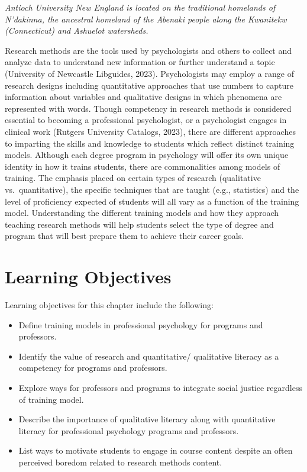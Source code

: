 \documentclass[
  11pt,
]{book}
\providecommand{\tightlist}{%
  \setlength{\itemsep}{0pt}\setlength{\parskip}{0pt}}
\begin{document}
\emph{Antioch University New England is located on the traditional homelands of N'dakinna, the ancestral homeland of the Abenaki people along the Kwanitekw (Connecticut) and Ashuelot watersheds.}~

Research methods are the tools used by psychologists and others to collect and analyze data to understand new information or further understand a topic (University of Newcastle Libguides, 2023). Psychologists may employ a range of research designs including quantitative approaches that use numbers to capture information about variables and qualitative designs in which phenomena are represented with words. Though competency in research methods is considered essential to becoming a professional psychologist, or a psychologist engages in clinical work (Rutgers University Catalogs, 2023), there are different approaches to imparting the skills and knowledge to students which reflect distinct training models. Although each degree program in psychology will offer its own unique identity in how it trains students, there are commonalities among models of training. The emphasis placed on certain types of research (qualitative vs.~quantitative), the specific techniques that are taught (e.g., statistics) and the level of proficiency expected of students will all vary as a function of the training model. Understanding the different training models and how they approach teaching research methods will help students select the type of degree and program that will best prepare them to achieve their career goals.

\section{Learning Objectives}\label{learning-objectives-2}

Learning objectives for this chapter include the following:

\begin{itemize}
\tightlist
\item
  Define training models in professional psychology for programs and professors.
\item
  Identify the value of research and quantitative/ qualitative literacy as a competency for programs and professors.
\item
  Explore ways for professors and programs to integrate social justice regardless of training model.
\item
  Describe the importance of qualitative literacy along with quantitative literacy for professional psychology programs and professors.
\item
  List ways to motivate students to engage in course content despite an often perceived boredom related to research methods content.
\end{itemize}
\end{document}
